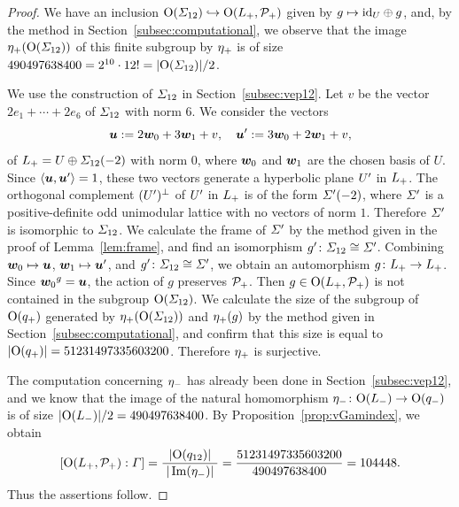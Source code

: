 \documentclass{amsart} %
\begin{document}
\begin{proof}
We have an inclusion $\mathord{\mathrm{O}}(\varSigma_{12})\hookrightarrow \mathord{\mathrm{O}}(L_{+}, \mathord{\mathcal{P}}_{+})$
given by $g\mapsto \mathord{\mathrm{id}}_{U}\oplus g$,
and, by the method in Section~\ref{subsec:computational}, 
we observe that 
 the image ${\eta}_{+}(\mathord{\mathrm{O}}(\varSigma_{12}))$ of this finite subgroup %
by ${\eta}_{+}$ is 
of size $490497638400=2^{10}\cdot 12!=|\mathord{\mathrm{O}}(\varSigma_{12})|/2$.
 \par
 We use the construction of $\varSigma_{12}$ in Section~\ref{subsec:vep12}.
 Let $v$ be the vector $2e_1+\cdots +2e_6$ of $\varSigma_{12}$ with norm $6$.
 We consider the vectors
 \[
 \boldsymbol{u}:=2\boldsymbol{w}_0+ 3\boldsymbol{w}_1+v,
 \quad 
 \boldsymbol{u}^{\prime}:=3\boldsymbol{w}_0+ 2\boldsymbol{w}_1+v,
 \]
 of $L_{+}=U\oplus \varSigma_{12}(-2)$ with norm $0$,
 where $\boldsymbol{w}_0$ and $\boldsymbol{w}_1$ are the chosen basis of $U$. 
Since 
$\langle \boldsymbol{u}, \boldsymbol{u}^{\prime} \rangle=1$, these two vectors 
generate a hyperbolic plane $U^{\prime}$ in $L_{+}$.
 The orthogonal complement $(U^{\prime})^{\perp}$ of $U^{\prime}$ in $L_{+}$
 is of the form $\varSigma^{\prime}(-2)$,
where $\varSigma^{\prime}$ is a positive-definite odd unimodular lattice
with no vectors of norm $1$.
Therefore $\varSigma^{\prime}$ is isomorphic to $\varSigma_{12}$.
We calculate the frame of $\varSigma^{\prime}$ 
by the method given in the proof of Lemma~\ref{lem:frame},
and find an isomorphism $g^{\prime} \colon \varSigma_{12}\cong \varSigma^{\prime}$.
Combining $\boldsymbol{w}_0\mapsto \boldsymbol{u}$, $\boldsymbol{w}_1\mapsto \boldsymbol{u}^{\prime}$,
and $g^{\prime} \colon \varSigma_{12}\cong \varSigma^{\prime}$,
we obtain an automorphism $g\colon L_{+}\to L_{+}$.
Since ${\boldsymbol{w}_0}^g= \boldsymbol{u}$, 
the action of $g$ preserves $\mathord{\mathcal{P}}_{+}$.
Then $g\in \mathord{\mathrm{O}}(L_{+}, \mathord{\mathcal{P}}_{+})$
 is not contained in the subgroup $\mathord{\mathrm{O}}(\varSigma_{12})$.
We calculate the size of the subgroup of $\mathord{\mathrm{O}}(q_{+})$
generated by ${\eta}_{+}(\mathord{\mathrm{O}}(\varSigma_{12}))$ and ${\eta}_{+} (g)$
by the method given in Section~\ref{subsec:computational}, 
and confirm that 
this size is equal to $|\mathord{\mathrm{O}}(q_{+})|=51231497335603200$.
Therefore ${\eta}_{+}$ is surjective.
%
\par
The computation concerning ${\eta}_{-}$ has already been  done in 
Section~\ref{subsec:vep12},
and we know that the image of 
the natural homomorphism 
${\eta}_{-}\colon \mathord{\mathrm{O}}(L_{-}) \to \mathord{\mathrm{O}}(q_{-})$
is of size 
$|\mathord{\mathrm{O}}(L_{-})|/2=490497638400$.
By Proposition~\ref{prop:vGamindex},
we obtain 
\[
[\mathord{\mathrm{O}}(L_{+}, \mathord{\mathcal{P}}_{+}): \varGamma]
= \frac{ |\mathord{\mathrm{O}}(q_{12})|}{\; |\operatorname{Im}({\eta}_{-})|\;}
=
\frac{51231497335603200}{490497638400}
=
104448.
\]
Thus the assertions follow.
\end{proof}
\end{document}

